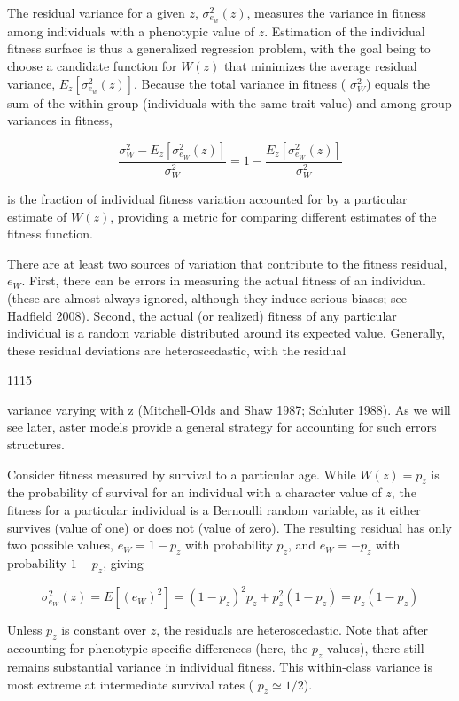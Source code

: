 \documentclass{article}
\begin{document}
The residual variance for a given  $ z $,  $ \sigma_{e_w}^2(z) $, measures the variance in fitness among individuals with a phenotypic value of  $ z $. Estimation of the individual fitness surface is thus a generalized regression problem, with the goal being to choose a candidate function for  $ W(z) $ that minimizes the average residual variance,  $ E_z[\sigma_{e_w}^2(z)] $. Because the total variance in fitness ( $ \sigma_W^2 $) equals the sum of the within-group (individuals with the same trait value) and among-group variances in fitness,

\begin{equation}
\frac{\sigma_{W}^{2}-E_{z}[\sigma_{e_{W}}^{2}(z)]}{\sigma_{W}^{2}}=1-\frac{E_{z}[\sigma_{e_{W}}^{2}(z)]}{\sigma_{W}^{2}}
\end{equation}

is the fraction of individual fitness variation accounted for by a particular estimate of  $ W(z) $, providing a metric for comparing different estimates of the fitness function.

There are at least two sources of variation that contribute to the fitness residual,  $ e_{W} $. First, there can be errors in measuring the actual fitness of an individual (these are almost always ignored, although they induce serious biases; see Hadfield 2008). Second, the actual (or realized) fitness of any particular individual is a random variable distributed around its expected value. Generally, these residual deviations are heteroscedastic, with the residual

1115

variance varying with z (Mitchell-Olds and Shaw 1987; Schluter 1988). As we will see later, aster models provide a general strategy for accounting for such errors structures.

Consider fitness measured by survival to a particular age. While  $ W(z) = p_z $ is the probability of survival for an individual with a character value of  $ z $, the fitness for a particular individual is a Bernoulli random variable, as it either survives (value of one) or does not (value of zero). The resulting residual has only two possible values,  $ e_W = 1 - p_z $ with probability  $ p_z $, and  $ e_W = -p_z $ with probability  $ 1 - p_z $, giving

\begin{equation}
\sigma_{e_{W}}^{2}(z)=E[(e_{W})^{2}]=(1-p_{z})^{2}p_{z}+p_{z}^{2}(1-p_{z})=p_{z}(1-p_{z})
\end{equation}

Unless  $ p_z $ is constant over  $ z $, the residuals are heteroscedastic. Note that after accounting for phenotypic-specific differences (here, the  $ p_z $ values), there still remains substantial variance in individual fitness. This within-class variance is most extreme at intermediate survival rates ( $ p_z \simeq 1/2 $).
\end{document}
